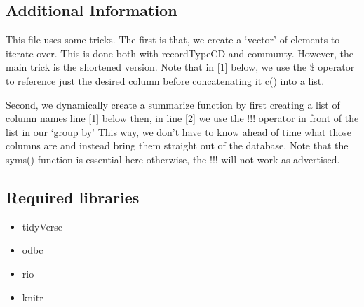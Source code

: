 \documentclass[
]{article}
\newenvironment{Shaded}{\begin{snugshade}}{\end{snugshade}}
\newcommand{\AttributeTok}[1]{\textcolor[rgb]{0.13,0.29,0.53}{#1}}
\newcommand{\ConstantTok}[1]{\textcolor[rgb]{0.56,0.35,0.01}{#1}}
\newcommand{\DecValTok}[1]{\textcolor[rgb]{0.00,0.00,0.81}{#1}}
\newcommand{\FunctionTok}[1]{\textcolor[rgb]{0.13,0.29,0.53}{\textbf{#1}}}
\newcommand{\NormalTok}[1]{#1}
\newcommand{\OtherTok}[1]{\textcolor[rgb]{0.56,0.35,0.01}{#1}}
\newcommand{\SpecialCharTok}[1]{\textcolor[rgb]{0.81,0.36,0.00}{\textbf{#1}}}
\providecommand{\tightlist}{%
  \setlength{\itemsep}{0pt}\setlength{\parskip}{0pt}}
\begin{document}
\subsection{Additional Information}\label{additional-information}

This file uses some tricks. The first is that, we create a `vector' of
elements to iterate over. This is done both with recordTypeCD and
communty. However, the main trick is the shortened version. Note that in
{[}1{]} below, we use the \$ operator to reference just the desired
column before concatenating it c() into a list.

Second, we dynamically create a summarize function by first creating a
list of column names line {[}1{]} below then, in line {[}2{]} we use the
!!! operator in front of the list in our `group by' This way, we don't
have to know ahead of time what those columns are and instead bring them
straight out of the database. Note that the syms() function is essential
here otherwise, the !!! will not work as advertised.

\begin{Shaded}
\end{Shaded}

\subsection{Required libraries}\label{required-libraries}

\begin{itemize}
\tightlist
\item
  tidyVerse\\
\item
  odbc\\
\item
  rio\\
\item
  knitr
\end{itemize}
\end{document}
